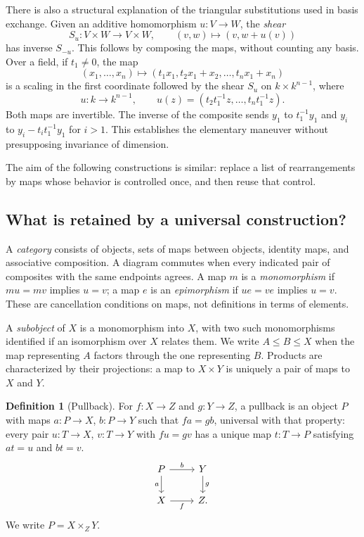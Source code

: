 \documentclass[11pt]{article}
\theoremstyle{definition}
\newtheorem{definition}[theorem]{Definition}
\theoremstyle{remark}\newtheorem{remark}[theorem]{Remark}
\newcommand{\kk}{k}
\begin{document}
There is also a structural explanation of the triangular substitutions
used in basis exchange. Given an additive homomorphism $u:V\to W$, the
\emph{shear}
\[
S_u:V\times W\longrightarrow V\times W,
\qquad (v,w)\longmapsto(v,w+u(v))
\]
has inverse $S_{-u}$. This follows by composing the maps, without counting
any basis. Over a field, if $t_1\ne0$, the map
\[
(x_1,\ldots,x_n)\longmapsto
(t_1x_1,t_2x_1+x_2,\ldots,t_nx_1+x_n)
\]
is a scaling in the first coordinate followed by the shear $S_u$ on
$\kk\times\kk^{n-1}$, where
\[
u:\kk\longrightarrow\kk^{n-1},\qquad
u(z)=(t_2t_1^{-1}z,\ldots,t_nt_1^{-1}z).
\]
Both maps are invertible. The inverse of the composite sends $y_1$ to
$t_1^{-1}y_1$ and $y_i$ to
$y_i-t_i t_1^{-1}y_1$ for $i>1$. This establishes the elementary maneuver
without presupposing invariance of dimension.

The aim of the following constructions is similar: replace a list of
rearrangements by maps whose behavior is controlled once, and then reuse
that control.

\subsection{What is retained by a universal construction?}

A \emph{category} consists of objects, sets of maps between objects,
identity maps, and associative composition. A diagram commutes when
every indicated pair of composites with the same endpoints agrees.
A map $m$ is a \emph{monomorphism} if $mu=mv$ implies $u=v$; a map $e$
is an \emph{epimorphism} if $ue=ve$ implies $u=v$. These are cancellation
conditions on maps, not definitions in terms of elements.

A \emph{subobject} of $X$ is a monomorphism into $X$, with two such
monomorphisms identified if an isomorphism over $X$ relates them. We
write $A\leq B\leq X$ when the map representing $A$ factors through the
one representing $B$. Products are characterized by their projections:
a map to $X\times Y$ is uniquely a pair of maps to $X$ and $Y$.

\begin{definition}[Pullback]
For $f:X\to Z$ and $g:Y\to Z$, a pullback is an object $P$ with maps
$a:P\to X$, $b:P\to Y$ such that $fa=gb$, universal with that property:
every pair $u:T\to X$, $v:T\to Y$ with $fu=gv$ has a unique map
$t:T\to P$ satisfying $at=u$ and $bt=v$.
\[
\begin{tikzcd}
P \arrow[r,"b"] \arrow[d,"a"'] & Y \arrow[d,"g"]\\
X \arrow[r,"f"'] & Z.
\end{tikzcd}
\]
We write $P=X\times_ZY$.
\end{definition}
\end{document}
